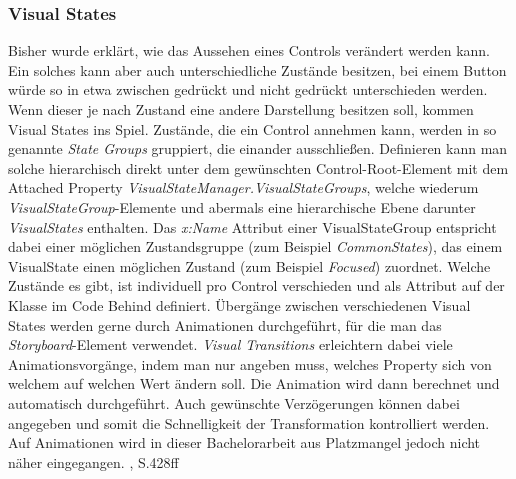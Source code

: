 \documentclass[a4paper,bibtotoc,oneside]{scrbook}
\begin{document}
\subsubsection[Visual States]{Visual States}\label{ref:visualstates}
Bisher wurde erklärt, wie das Aussehen eines Controls verändert werden kann. Ein solches kann aber auch unterschiedliche Zustände besitzen, bei einem Button würde so in etwa zwischen gedrückt und nicht gedrückt unterschieden werden. Wenn dieser je nach Zustand eine andere Darstellung besitzen soll, kommen Visual States ins Spiel.
\newline
\newline
Zustände, die ein Control annehmen kann, werden in so genannte \textit{State Groups} gruppiert, die einander ausschließen. Definieren kann man solche hierarchisch direkt unter dem gewünschten Control-Root-Element mit dem Attached Property \textit{VisualStateManager.VisualStateGroups}, welche wiederum \textit{VisualStateGroup}-Elemente und abermals eine hierarchische Ebene darunter \textit{VisualStates} enthalten.
\newline
Das \textit{x:Name} Attribut einer VisualStateGroup entspricht dabei einer möglichen Zustandsgruppe (zum Beispiel \textit{CommonStates}), das einem VisualState einen möglichen Zustand (zum Beispiel \textit{Focused}) zuordnet. Welche Zustände es gibt, ist individuell pro Control verschieden und als Attribut auf der Klasse im Code Behind definiert.
\newline
\newline
Übergänge zwischen verschiedenen Visual States werden gerne durch Animationen durchgeführt, für die man das \textit{Storyboard}-Element verwendet. \textit{Visual Transitions} erleichtern dabei viele Animationsvorgänge, indem man nur angeben muss, welches Property sich von welchem auf welchen Wert ändern soll. Die Animation wird dann berechnet und automatisch durchgeführt. Auch gewünschte Verzögerungen können dabei angegeben und somit die Schnelligkeit der Transformation kontrolliert werden.
\newline
Auf Animationen wird in dieser Bachelorarbeit aus Platzmangel jedoch nicht näher eingegangen. \cite{ana12}, S.428ff
\end{document}
